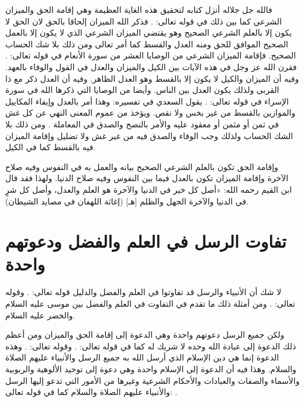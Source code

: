 فالله جل جلاله أنزل كتابه لتحقيق هذه الغاية العظيمة وهي إقامة الحق والميزان الشرعي كما بين ذلك في قوله تعالى:
\quranayah*[42][17]{\footnotesize \surahname*[42]}.
فذكر الله الميزان إلحاقا بالحق لان الحق لا يكون إلا بالعلم الشرعي الصحيح وهو يقتضي الميزان الشرعي الذي لا يكون إلا بالعمل الصحيح الموافق للحق ومنه العدل والقسط كما أمر تعالى ومن ذلك بلا شك الحساب الصحيح. فإقامة الميزان الشرعي من الوصايا العشر من سورة الأنعام في قوله تعالى:
\quranayah*[6][152][12]{\footnotesize \surahname*[6]}. فقرن الله عز وجل في هذه الآيات بين الكيل والميزان والعدل في القول والوفاء بالعهد. وفيه أن الميزان والكيل لا يكون إلا بالقسط وهو العدل الظاهر. وفيه أن العدل ذكر مع ذا القربى ولذلك يكون العدل بين الناس.
وأيضا من الوصايا التي ذكرها الله في سورة الإسراء في قوله تعالى:
\quranayah*[17][35]{\footnotesize \surahname*[17]}. يقول السعدي في تفسيره:
وهذا أمر بالعدل وإيفاء المكاييل والموازين بالقسط من غير بخس ولا نقص. ويؤخذ من عموم المعنى النهي عن كل غش في ثمن أو مثمن أو معقود عليه والأمر بالنصح والصدق في المعاملة \cite{tafsir_Saadi}. ومن ذلك بلا الشك الحساب ولذلك وجب الوفاء والصدق فيه من غير غش ولا تضليل وإقامة الميزان فيه بالقسط كما في الكيل.

وإقامة الحق تكون بالعلم الشرعي الصحيح بيانه والعمل به في النفوس وفيه صلاح الآخرة وإقامة الميزان تكون بالعدل فيما بين النفوس وفيه صلاح الدنيا. ولهذا فقد قال ابن القيم رحمه الله: «أصل كل خير في الدنيا والآخرة هو العلم والعدل، وأصل كل شرٍ في الدنيا والآخرة الجهل والظلم [هـ] {\footnotesize (إغاثة اللهفان في مصايد الشيطان)}.

\section{تفاوت الرسل في العلم والفضل ودعوتهم واحدة}

لا شك أن الأنبياء والرسل قد تفاوتوا في العلم والفضل والدليل قوله تعالى: 
\quranayah*[2][253]{\footnotesize \surahname*[2]}. وقوله تعالى:
\quranayah*[17][55]{\footnotesize \surahname*[17]}. ومن أمثلة ذلك ما تقدم في التفاوت في العلم والفضل بين موسى عليه السلام والخضر عليه السلام. 

ولكن جميع الرسل دعوتهم واحدة وهي الدعوة إلى إقامة الحق والميزان ومن أعظم ذلك الدعوة إلى عبادة الله وحده لا شريك له كما في قوله تعالى: 
\quranayah*[16][36]{\footnotesize \surahname*[16]}. وقوله تعالى:
\quranayah*[21][25]{\footnotesize \surahname*[21]}. وهذه الدعوة إنما هي دين الإسلام الذي أرسل الله به جميع الرسل والأنبياء عليهم الصلاة والسلام. وهذا فيه أن الدعوة إلى الإسلام واحدة وهي دعوة إلى توحيد الألوهية والربوبية والأسماء والصفات والعبادات والأحكام الشرعية وغيرها من الأمور التي تدعو إليها الرسل والأنبياء عليهم الصلاة والسلام كما في قوله تعالى: 
\quranayah*[42][13]{\footnotesize \surahname*[42]}.

